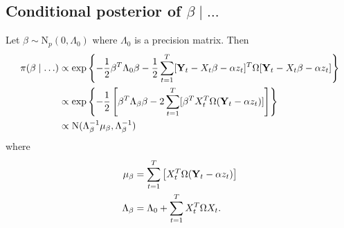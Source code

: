 \subsection*{Conditional posterior of $\beta \mid \ldots$}\label{s:betapost}
Let $\beta \sim \mbox{N}_{p}(0, \Lambda_0)$ where $\Lambda_0$ is a precision matrix. Then 
\begin{align*}
    \pi(\beta \mid \ldots) & \propto \exp \left\{ - \frac{ 1 }{ 2 } \beta^T \Lambda_0 \beta - \frac{ 1 }{ 2 } \sum_{t = 1 }^T [\mbox{\bf Y}_t - X_t \beta - \alpha z_t]^T \Omega [\mbox{\bf Y}_t - X_t \beta - \alpha z_t] \right\}\\
     & \propto \exp \left\{ -\frac{ 1 }{ 2 } \left[ \beta^T \Lambda_\beta \beta  - 2 \sum_{ t = 1 }^T [ \beta^T X_t^T \Omega (\mbox{\bf Y}_t - \alpha z_t )] \right] \right\}\\
     & \propto \mbox{N} ( \Lambda_\beta^{-1} \mu_\beta , \Lambda_\beta^{-1})
\end{align*}
where
\begin{align*}
    \mu_\beta &= \sum_{t=1}^{T} \left[ X_t^T \Omega (\mbox{\bf Y}_t - \alpha z_t) \right]\\
    \Lambda_\beta &= \Lambda_0 + \sum_{ t = 1 }^{ T} X_t^T \Omega X_t. 
\end{align*}
